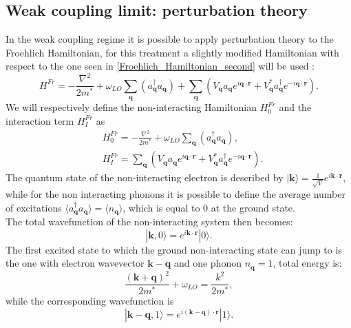 \subsection{Weak coupling limit: perturbation theory}
In the weak coupling regime it is possible to apply perturbation theory to the Froehlich Hamiltonian, for this treatment a slightly modified 
Hamiltonian with respect to the one seen in \ref{Froehlich_Hamiltonian_second} will be used \cite{alexandrov2010advances}:
\begin{equation}
    H^{Fr}=-\frac{\nabla^2}{2m^*}+\omega_{LO}\sum_{\mathbf{q}}(a_\mathbf{q}^\dagger a_\mathbf{q})+\sum_{\mathbf{q}}(V_\mathbf{q}a_\mathbf{q}e^{i\mathbf{q}\cdot\mathbf{r}}+V^*_\mathbf{q}a^\dagger_\mathbf{q}e^{-i\mathbf{q}\cdot\mathbf{r}}).
    \label{Hamiltonian_Froehlich_new}
\end{equation}
We will respectively define the non-interacting Hamiltonian $H_0^{Fr}$ and the interaction term $H_I^{Fr}$ as
\begin{equation}
\begin{split}
    &H_0^{Fr}=-\frac{\nabla^2}{2m^*}+\omega_{LO}\sum_{\mathbf{q}}(a_\mathbf{q}^\dagger a_\mathbf{q}),\\
    &H_I^{Fr}=\sum_{\mathbf{q}}(V_\mathbf{q}a_\mathbf{q}e^{i\mathbf{q}\cdot\mathbf{r}}+V^*_\mathbf{q}a^\dagger_\mathbf{q}e^{-i\mathbf{q}\cdot\mathbf{r}}).
\end{split}
\end{equation}
The quantum state of the non-interacting electron is described by $|\mathbf{k}\rangle=\frac{1}{\sqrt{V}}e^{i\mathbf{k}\cdot\mathbf{r}}$, 
while for the non interacting phonons it is possible to define the average number of excitations $\langle a^\dagger_\mathbf{q}a_\mathbf{q}\rangle=\langle n_\mathbf{q}\rangle$, 
which is equal to 0 at the ground state.\\
The total wavefunction of the non-interacting system then becomes:
\begin{equation}
    |{\mathbf{k},0}\rangle=e^{i\mathbf{k}\cdot\mathbf{r}}|0\rangle.
\end{equation}
The first excited state to which the ground non-interacting state can jump to is the one with electron wavevector $\mathbf{k}-\mathbf{q}$ and 
one phonon $n_\mathbf{q}=1$, total energy is:
\begin{equation}
    \frac{(\mathbf{k}+\mathbf{q})^2}{2m^*}+\omega_{LO}=\frac{k^2}{2m^*},
\end{equation}
while the corresponding wavefunction is
\begin{equation}
    |\mathbf{k}-\mathbf{q},1\rangle =e^{i(\mathbf{k}-\mathbf{q})\cdot \mathbf{r}}|1\rangle.
\end{equation}

